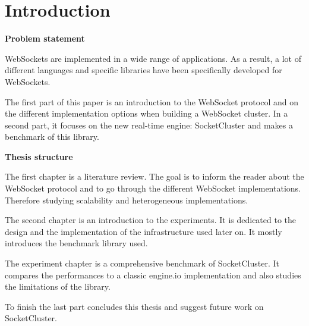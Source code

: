 \chapter*{Introduction}

\textbf{Problem statement}

WebSockets are implemented in a wide range of applications. As a result, a lot
of different languages and specific libraries have been specifically developed
for WebSockets.

The first part of this paper is an introduction to the WebSocket protocol and
on the different implementation options when building a WebSocket cluster. In a
second part, it focuses on the new real-time engine: SocketCluster and makes a
benchmark of this library.

\textbf{Thesis structure}

The first chapter is a literature review. The goal is to inform the reader
about the WebSocket protocol and to go through the different WebSocket
implementations. Therefore studying scalability and heterogeneous
implementations.

The second chapter is an introduction to the experiments. It is dedicated to the
design and the implementation of the infrastructure used later on. It mostly 
introduces the benchmark library used.

The experiment chapter is a comprehensive benchmark of SocketCluster. It 
compares the performances to a classic engine.io implementation and also
studies the limitations of the library.

To finish the last part concludes this thesis and suggest future work on 
SocketCluster.


